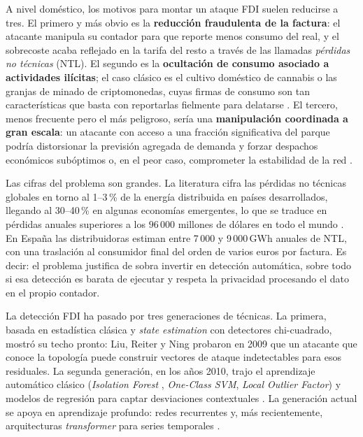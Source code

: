 A nivel doméstico, los motivos para montar un ataque FDI suelen reducirse a tres. El primero y más obvio es la \textbf{reducción fraudulenta de la factura}: el atacante manipula su contador para que reporte menos consumo del real, y el sobrecoste acaba reflejado en la tarifa del resto a través de las llamadas \emph{pérdidas no técnicas} (NTL). El segundo es la \textbf{ocultación de consumo asociado a actividades ilícitas}; el caso clásico es el cultivo doméstico de cannabis o las granjas de minado de criptomonedas, cuyas firmas de consumo son tan características que basta con reportarlas fielmente para delatarse \cite{messinis2018review}. El tercero, menos frecuente pero el más peligroso, sería una \textbf{manipulación coordinada a gran escala}: un atacante con acceso a una fracción significativa del parque podría distorsionar la previsión agregada de demanda y forzar despachos económicos subóptimos o, en el peor caso, comprometer la estabilidad de la red \cite{liu2017review}.

Las cifras del problema son grandes. La literatura cifra las pérdidas no técnicas globales en torno al 1--3\,\% de la energía distribuida en países desarrollados, llegando al 30--40\,\% en algunas economías emergentes, lo que se traduce en pérdidas anuales superiores a los $96\,000$ millones de dólares en todo el mundo \cite{viegas2017review,messinis2018review}. En España las distribuidoras estiman entre 7\,000 y 9\,000\,GWh anuales de NTL, con una traslación al consumidor final del orden de varios euros por factura. Es decir: el problema justifica de sobra invertir en detección automática, sobre todo si esa detección es barata de ejecutar y respeta la privacidad procesando el dato en el propio contador.

La detección FDI ha pasado por tres generaciones de técnicas. La primera, basada en estadística clásica y \emph{state estimation} con detectores chi-cuadrado, mostró su techo pronto: Liu, Reiter y Ning probaron en 2009 \cite{liu2009fdi} que un atacante que conoce la topología puede construir vectores de ataque indetectables para esos residuales. La segunda generación, en los años 2010, trajo el aprendizaje automático clásico (\textit{Isolation Forest} \cite{liu2008isolation}, \textit{One-Class SVM}, \textit{Local Outlier Factor}) y modelos de regresión para captar desviaciones contextuales \cite{zheng2018wide,messinis2018review}. La generación actual se apoya en aprendizaje profundo: redes recurrentes y, más recientemente, arquitecturas \textit{transformer} para series temporales \cite{vaswani2017attention,nie2023patchtst,wu2023timesnet,xu2022anomaly}.

